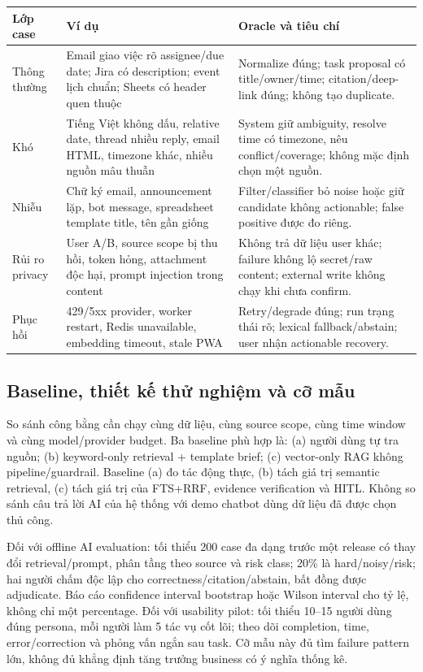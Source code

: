\documentclass[11pt,a4paper]{article}
\begin{document}
\begin{longtable}{p{2.45cm}p{4.3cm}p{6.9cm}}
\toprule
\textbf{Lớp case} & \textbf{Ví dụ} & \textbf{Oracle và tiêu chí} \\
\midrule
\endhead
Thông thường & Email giao việc rõ assignee/due date; Jira có description; event lịch chuẩn; Sheets có header quen thuộc & Normalize đúng; task proposal có title/owner/time; citation/deep-link đúng; không tạo duplicate. \\
Khó & Tiếng Việt không dấu, relative date, thread nhiều reply, email HTML, timezone khác, nhiều nguồn mâu thuẫn & System giữ ambiguity, resolve time có timezone, nêu conflict/coverage; không mặc định chọn một nguồn. \\
Nhiễu & Chữ ký email, announcement lặp, bot message, spreadsheet template title, tên gần giống & Filter/classifier bỏ noise hoặc giữ candidate không actionable; false positive được đo riêng. \\
Rủi ro privacy & User A/B, source scope bị thu hồi, token hỏng, attachment độc hại, prompt injection trong content & Không trả dữ liệu user khác; failure không lộ secret/raw content; external write không chạy khi chưa confirm. \\
Phục hồi & 429/5xx provider, worker restart, Redis unavailable, embedding timeout, stale PWA & Retry/degrade đúng; run trạng thái rõ; lexical fallback/abstain; user nhận actionable recovery. \\
\bottomrule
\end{longtable}

\subsection{Baseline, thiết kế thử nghiệm và cỡ mẫu}

So sánh công bằng cần chạy cùng dữ liệu, cùng source scope, cùng time window và cùng model/provider budget. Ba baseline phù hợp là: (a) người dùng tự tra nguồn; (b) keyword-only retrieval + template brief; (c) vector-only RAG không pipeline/guardrail. Baseline (a) đo tác động thực, (b) tách giá trị semantic retrieval, (c) tách giá trị của FTS+RRF, evidence verification và HITL. Không so sánh câu trả lời AI của hệ thống với demo chatbot dùng dữ liệu đã được chọn thủ công.

Đối với offline AI evaluation: tối thiểu 200 case đa dạng trước một release có thay đổi retrieval/prompt, phân tầng theo source và risk class; 20\% là hard/noisy/risk; hai người chấm độc lập cho correctness/citation/abstain, bất đồng được adjudicate. Báo cáo confidence interval bootstrap hoặc Wilson interval cho tỷ lệ, không chỉ một percentage. Đối với usability pilot: tối thiểu 10--15 người dùng đúng persona, mỗi người làm 5 tác vụ cốt lõi; theo dõi completion, time, error/correction và phỏng vấn ngắn sau task. Cỡ mẫu này đủ tìm failure pattern lớn, không đủ khẳng định tăng trưởng business có ý nghĩa thống kê.
\end{document}
